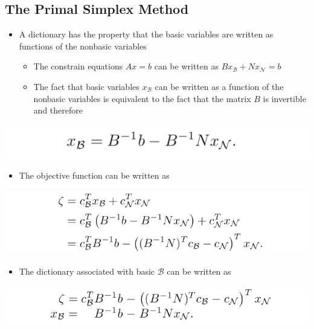 \documentclass[11pt]{article}
\begin{document}
\subsection{The Primal Simplex Method}
\label{sec:org2f54449}
\begin{itemize}
\item A dictionary has the property that the basic variables are written as functions of the nonbasic variables
\begin{itemize}
\item The constrain equations \(Ax = b\) can be written as \(B x_{\mathcal B} + N x_{\mathcal N} = b\)
\item The fact that basic variables \(x_{\mathcal B}\) can be written as a function of the nonbasic variables is equivalent to the fact that the matrix \(B\) is invertible and therefore
\end{itemize}
\end{itemize}
\begin{center}
\includegraphics[width=.9\linewidth]{The Simplex Method in Matrix Notation/screenshot_2019-02-11_16-26-40.png}
\end{center}
\begin{itemize}
\item The objective function can be written as
\end{itemize}
\begin{center}
\includegraphics[width=.9\linewidth]{The Simplex Method in Matrix Notation/screenshot_2019-02-11_16-27-18.png}
\end{center}
\begin{itemize}
\item The dictionary associated with basic \(\mathcal B\) can be written as
\end{itemize}
\begin{center}
\includegraphics[width=.9\linewidth]{The Simplex Method in Matrix Notation/screenshot_2019-02-11_16-28-16.png}
\end{center}
\end{document}
